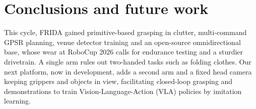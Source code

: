 \section{Conclusions and future work}

This cycle, FRIDA gained primitive-based grasping in clutter, multi-command GPSR planning, venue detector training and an open-source omnidirectional base, whose wear at RoboCup 2026 calls for endurance testing and a sturdier drivetrain. A single arm rules out two-handed tasks such as folding clothes. Our next platform, now in development, adds a second arm and a fixed head camera keeping grippers and objects in view, facilitating closed-loop grasping and demonstrations to train Vision-Language-Action (VLA) policies by imitation learning.
                               
